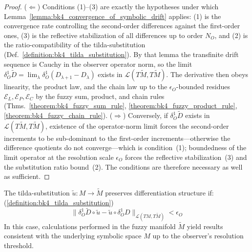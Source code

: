 \begin{proof}
\label{proof:bk4_existence_observer_valid_derivatives}
\leavevmode
($\Leftarrow$) Conditions (1)--(3) are exactly the hypotheses under which Lemma~\ref{lemma:bk4_convergence_of_symbolic_drift} applies: (1) is the convergence rate controlling the second-order differences against the first-order ones, (3) is the reflective stabilization of all differences up to order $N_O$, and (2) is the ratio-compatibility of the tilda-substitution (Def.~\ref{definition:bk4_tilda_substitution}). By that lemma the transfinite drift sequence is Cauchy in the observer operator norm, so the limit $\delta^1_O \widetilde{D} = \lim_{\lambda} \delta^1_O(D_{\lambda+1} - D_\lambda)$ exists in $\mathcal{L}(T\widetilde{M}, T\widetilde{M})$. The derivative then obeys linearity, the product law, and the chain law up to the $\epsilon_O$-bounded residues $\mathcal{E}_L, \mathcal{E}_P, \mathcal{E}_C$ by the fuzzy sum, product, and chain rules (Thms.~\ref{theorem:bk4_fuzzy_sum_rule}, \ref{theorem:bk4_fuzzy_product_rule}, \ref{theorem:bk4_fuzzy_chain_rule}).
($\Rightarrow$) Conversely, if $\delta^1_O \widetilde{D}$ exists in $\mathcal{L}(T\widetilde{M}, T\widetilde{M})$, existence of the operator-norm limit forces the second-order increments to be sub-dominant to the first-order increments---otherwise the difference quotients do not converge---which is condition~(1); boundedness of the limit operator at the resolution scale $\epsilon_O$ forces the reflective stabilization~(3) and the substitution ratio bound~(2). The conditions are therefore necessary as well as sufficient.
\end{proof}
\begin{corollary} \label{corollary:bk4_validity_of_tilda_substit}
The tilda-substitution $\tilde{u}: M \to \widetilde{M}$ preserves differentiation structure if: (\ref{definition:bk4_tilda_substitution})
\[
\|\delta^1_O \widetilde{D} \circ \tilde{u} - \tilde{u} \circ \delta^1_O D\|_{\mathcal{L}(TM, T\widetilde{M})} < \epsilon_O
\]
In this case, calculations performed in the fuzzy manifold $\widetilde{M}$ yield results consistent with the underlying symbolic space $M$ up to the observer's resolution threshold.
\end{corollary}

